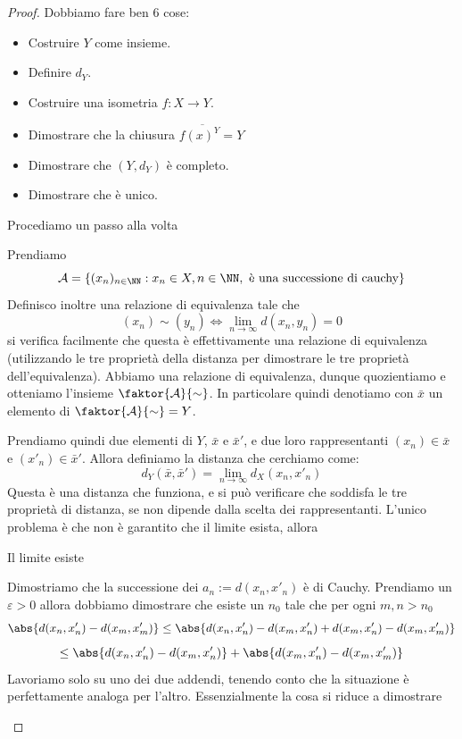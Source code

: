 \documentclass[11pt]{scrartcl}
\begin{document}
  	\begin{proof}
  		Dobbiamo fare ben $6$ cose:
  		\begin{itemize}
  			\item[1] Costruire $Y$ come insieme.
  			\item[2] Definire $d_Y$.
  			\item[3] Costruire una isometria $f:X\to Y$.
  			\item[4] Dimostrare che la chiusura $f\overline{(x)^Y}=Y$
  			\item[5] Dimostrare che $(Y,d_Y)$ è completo.
  			\item[6] Dimostrare che è unico.
  		\end{itemize}
  		Procediamo un passo alla volta
  		\begin{subproof}[Passo 1]
  			Prendiamo 
  			$$\mathcal{A}=\left\{(x_n)_{n\in\NN}:x_n\in X,n\in \NN, \text{ è una successione di cauchy}\right\}$$
  			Definisco inoltre una relazione di equivalenza tale che
  			$$(x_n)\sim(y_n) \iff \lim_{n\to \infty}d(x_n,y_n)=0$$
  			si verifica facilmente che questa è effettivamente una relazione di equivalenza (utilizzando le tre proprietà della distanza per dimostrare le tre proprietà dell'equivalenza). Abbiamo una relazione di equivalenza, dunque quozientiamo e otteniamo l'insieme $\faktor{\mathcal{A}}{\sim}$. In particolare quindi denotiamo con $\bar{x}$ un elemento di $\faktor{\mathcal{A}}{\sim}=Y$.
  		\end{subproof}
  		\begin{subproof}[Passo 2]
  			Prendiamo quindi due elementi di $Y$, $\bar{x}$ e $\bar{x}'$, e due loro rappresentanti $(x_n)\in \bar{x}$ e $(x'_n)\in\bar{x}'$. Allora definiamo la distanza che cerchiamo come:
  			$$d_Y(\bar{x},\bar{x}')=\lim_{n\to\infty}d_X(x_n,x'_n)$$
  			Questa è una distanza che funziona, e si può verificare che soddisfa le tre proprietà di distanza, se non dipende dalla scelta dei rappresentanti. L'unico problema è che non è garantito che il limite esista, allora
  			\begin{claim}
  				Il limite esiste
  			\end{claim}
  			\begin{subproof}
  				Dimostriamo che la successione dei $a_n:=d(x_n,x'_n)$ è di Cauchy. Prendiamo un $\varepsilon>0$ allora dobbiamo dimostrare che esiste un $n_0$ tale che per ogni $m,n>n_0$
  				$$\abs{d(x_n,x'_n)-d(x_m,x'_m)}\le \abs{d(x_n,x'_n)-d(x_m,x'_n)+d(x_m,x'_n)-d(x_m,x'_m)} $$
  				$$\le \abs{d(x_n,x'_n)-d(x_m,x'_n)}+\abs{d(x_m,x'_n)-d(x_m,x'_m)}$$
  				Lavoriamo solo su uno dei due addendi, tenendo conto che la situazione è perfettamente analoga per l'altro. Essenzialmente la cosa si riduce a dimostrare

\end{subproof}
\end{subproof}
\end{proof}
\end{document}
